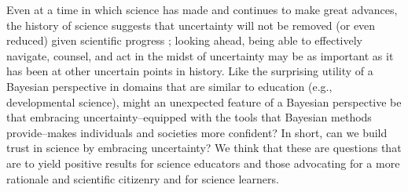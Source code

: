 \documentclass[man]{apa7}
\begin{document}
Even at a time in which science has made and continues to make great advances, the history of science suggests that uncertainty will not be removed (or even reduced) given scientific progress \parencite{fara2010science}; looking ahead, being able to effectively navigate, counsel, and act in the midst of uncertainty may be as important as it has been at other uncertain points in history. Like the surprising utility of a Bayesian perspective in domains that are similar to education (e.g., developmental science), might an unexpected feature of a Bayesian perspective be that embracing uncertainty--equipped with the tools that Bayesian methods provide--makes individuals and societies more confident? In short, can we build trust in science by embracing uncertainty? We think that these are questions that are  to yield positive results for science educators and those advocating for a more rationale and scientific citizenry and for science learners.

\printbibliography
\end{document}
